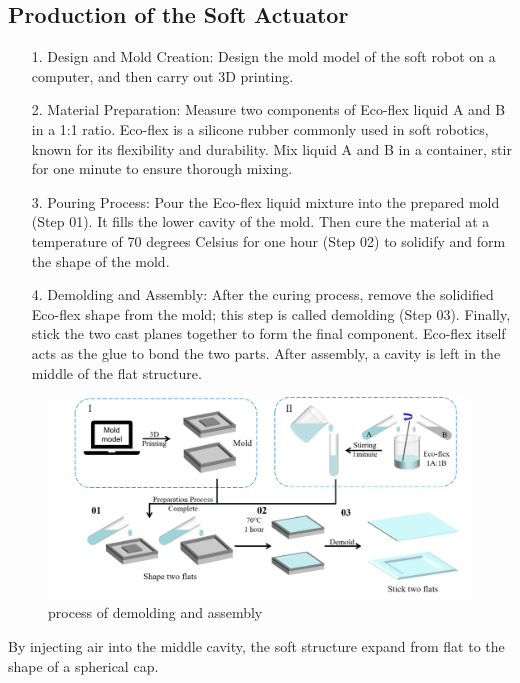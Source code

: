 \documentclass[10pt, a4paper, twocolumn]{article}
\begin{document}
\subsection{Production of the Soft Actuator}
\begin{itemize}
    \item [1.] Design and Mold Creation: Design the mold model of the soft robot on a computer, and then carry out 3D printing.
    \item [2.] Material Preparation: Measure two components of Eco-flex liquid A and B in a 1:1 ratio. Eco-flex is a silicone rubber commonly used in soft robotics, known for its flexibility and durability. Mix liquid A and B in a container, stir for one minute to ensure thorough mixing.
    \item [3.] Pouring Process: Pour the Eco-flex liquid mixture into the prepared mold (Step 01). It fills the lower cavity of the mold. Then cure the material at a temperature of 70 degrees Celsius for one hour (Step 02) to solidify and form the shape of the mold.
    \item [4.] Demolding and Assembly: After the curing process, remove the solidified Eco-flex shape from the mold; this step is called demolding (Step 03). Finally, stick the two cast planes together to form the final component. Eco-flex itself acts as the glue to bond the two parts. After assembly, a cavity is left in the middle of the flat structure.
\end{itemize}

\begin{figure}
    \centering
    \includegraphics[width=\linewidth]{demolding and assembly.png}
    \caption{process of demolding and assembly}
    \label{fig:demolding_assembly}
\end{figure}

By injecting air into the middle cavity, the soft structure expand from flat to the shape of a spherical cap.
\end{document}
